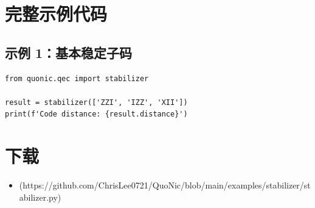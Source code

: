 \documentclass[12pt,a4paper]{article}
\begin{document}
\section{完整示例代码}

\subsection{示例 1：基本稳定子码}

\begin{verbatim}
from quonic.qec import stabilizer

result = stabilizer(['ZZI', 'IZZ', 'XII'])
print(f'Code distance: {result.distance}')
\end{verbatim}

\section{下载}

\begin{itemize}
  \item [stabilizer.py](https://github.com/ChrisLee0721/QuoNic/blob/main/examples/stabilizer/stabilizer.py)
\end{itemize}
\end{document}
